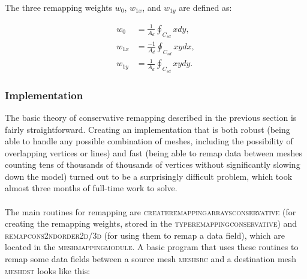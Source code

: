 \documentclass{article}
\begin{document}
The three remapping weights $w_0$, $w_{1x}$, and $w_{1y}$ are defined as:

\begin{align} \label{eq:remap_weights}
w_0 &= \frac{1}{A_d} \oint_{C_{sd}} x dy, \\
w_{1x} &= \frac{-1}{A_d} \oint_{C_{sd}} xy dx, \\
w_{1y} &= \frac{1}{A_d} \oint_{C_{sd}} xy dy.
\end{align}

\subsubsection{Implementation}

The basic theory of conservative remapping described in the previous section is fairly straightforward. Creating an implementation that is both robust (being able to handle any possible combination of meshes, including the possibility of overlapping vertices or lines) and fast (being able to remap data between meshes counting tens of thousands of thousands of vertices without significantly slowing down the model) turned out to be a surprisingly difficult problem, which took almost three months of full-time work to solve.\\
\\
The main routines for remapping are \textsc{create\textunderscore remapping\textunderscore arrays\textunderscore conservative} (for creating the remapping weights, stored in the \textsc{type\textunderscore remapping\textunderscore conservative}) and \textsc{remap\textunderscore cons\textunderscore 2nd\textunderscore order\textunderscore 2d/3d} (for using them to remap a data field), which are located in the \textsc{mesh\textunderscore mapping\textunderscore module}. A basic program that uses these routines to remap some data fields between a source mesh \textsc{mesh\textunderscore src} and a destination mesh \textsc{mesh\textunderscore dst} looks like this:\\
\end{document}
